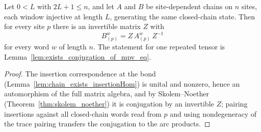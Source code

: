 \begin{lemma}%
    \label{lem:chain_exists_conjugation_of_sameState}
    \leanok
    Let $0 < L$ with $2L + 1 \le n$, and let $A$ and $B$ be
    site-dependent chains on $n$ sites, each window injective at length
    $L$, generating the same closed-chain state.  Then for every site $p$
    there is an invertible matrix $Z$ with
    \[
        B_{(p)}^{w} = Z\, A_{(p)}^{w}\, Z^{-1}
    \]
    for every word $w$ of length $n$.  The statement for one repeated
    tensor is Lemma~\ref{lem:exists_conjugation_of_mpv_eq}.
\end{lemma}
\begin{proof}\leanok
    The insertion correspondence at the bond
    (Lemma~\ref{lem:chain_exists_insertionHom}) is unital and nonzero,
    hence an automorphism of the full matrix algebra, and by
    Skolem--Noether (Theorem~\ref{thm:skolem_noether}) it is conjugation
    by an invertible $Z$; pairing insertions against all closed-chain
    words read from $p$ and using nondegeneracy of the trace pairing
    transfers the conjugation to the arc products.
\end{proof}

